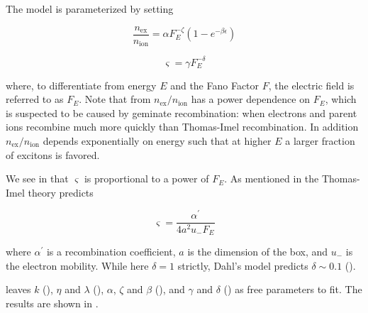 The model is parameterized by setting

\begin{equation}
\frac{n_{\mathrm{ex}}}{n_{\mathrm{ion}}} = \alpha F_{E}^{-\zeta} ( 1 - e^{-\beta \epsilon})
\label{eq:er_nr_calibrations_parameter_determ_nr_nex_nion}
\end{equation}

\begin{equation}
\varsigma = \gamma F_{E}^{- \delta}
\label{eq:er_nr_calibrations_parameter_determ_nr_recomb_sigma}
\end{equation}

\noindent where, to differentiate from energy $E$ and the Fano Factor $F$, the electric field is referred to as $F_E$.  Note that
from  $n_{\mathrm{ex}} / n_{\mathrm{ion}}$ has a power dependence on $F_E$,
which is suspected to be caused by geminate recombination: when electrons and parent ions recombine much more quickly than Thomas-Imel
recombination.  In addition $n_{\mathrm{ex}} / n_{\mathrm{ion}}$ depends exponentially on energy such that at higher $E$ a larger fraction
of excitons is favored.

We see in  that $\varsigma$ is proportional to a power of $F_E$.  As
mentioned in  the Thomas-Imel theory predicts

\begin{equation}
\varsigma = \frac{\alpha^{\prime}}{4 a^2 u_- F_E}
\end{equation}

\noindent where $\alpha ^{\prime}$ is a recombination coefficient, $a$ is the dimension of the box, and $u_-$ is the electron mobility.  While
here $\delta = 1$ strictly, Dahl's model predicts $\delta \sim 0.1$ ().

 leaves $k$ (), $\eta$ and $\lambda$
(), $\alpha$, $\zeta$ and $\beta$
(), and $\gamma$ and $\delta$
() as free parameters to fit.  The results are shown in
.

